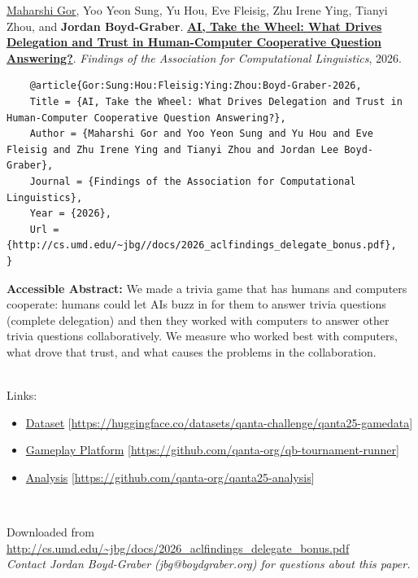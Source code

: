 \documentclass[a4paper]{article}
\begin{document}
    \underline{\href{https://mgor.info/}{Maharshi Gor}}, Yoo Yeon Sung, Yu Hou, Eve Fleisig, Zhu Irene Ying, Tianyi Zhou, and {\bf Jordan Boyd-Graber}.  {\bf \href{http://cs.umd.edu/~jbg//docs/2026_aclfindings_delegate_bonus.pdf}{AI, Take the Wheel: What Drives Delegation and Trust in Human-Computer Cooperative Question Answering?}}.  \emph{Findings of the Association for Computational Linguistics}, 2026.



    \vspace{5cm}

    \begin{verbatim}
    @article{Gor:Sung:Hou:Fleisig:Ying:Zhou:Boyd-Graber-2026,
	Title = {AI, Take the Wheel: What Drives Delegation and Trust in Human-Computer Cooperative Question Answering?},
	Author = {Maharshi Gor and Yoo Yeon Sung and Yu Hou and Eve Fleisig and Zhu Irene Ying and Tianyi Zhou and Jordan Lee Boyd-Graber},
	Journal = {Findings of the Association for Computational Linguistics},
	Year = {2026},
	Url = {http://cs.umd.edu/~jbg//docs/2026_aclfindings_delegate_bonus.pdf},
}

    \end{verbatim}

    {\bf Accessible Abstract:} We made a trivia game that has humans and computers cooperate: humans could let AIs buzz in for them to answer trivia questions (complete delegation) and then they worked with computers to answer other trivia questions collaboratively.  We measure who worked best with computers, what drove that trust, and what causes the problems in the collaboration.\\~

    

    \noindent Links:
\begin{itemize}
\item \href{https://huggingface.co/datasets/qanta-challenge/qanta25-gamedata}{Dataset} [\url{https://huggingface.co/datasets/qanta-challenge/qanta25-gamedata}]
\item \href{https://github.com/qanta-org/qb-tournament-runner}{Gameplay Platform} [\url{https://github.com/qanta-org/qb-tournament-runner}]
\item \href{https://github.com/qanta-org/qanta25-analysis}{Analysis} [\url{https://github.com/qanta-org/qanta25-analysis}]

\end{itemize}\

    \vspace{3cm}
    Downloaded from \url{http://cs.umd.edu/~jbg/docs/2026_aclfindings_delegate_bonus.pdf}  \\

    \vspace{2cm}
    \textit{Contact Jordan Boyd-Graber (jbg@boydgraber.org) for questions about this paper.}

    

    
\end{document}
